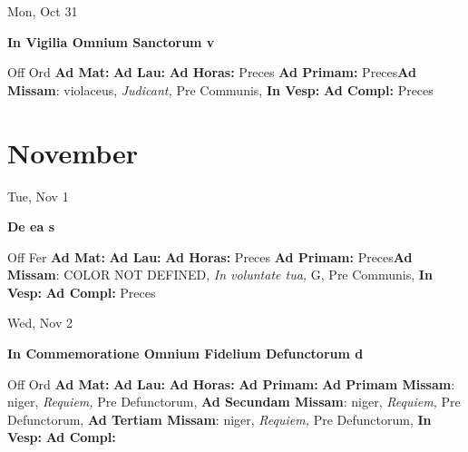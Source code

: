 \documentclass[10pt]{book}
\begin{document}
\begin{center}
\begin{minipage}{3.5in}
\vspace{2em}
\begin{center}Mon, Oct 31
\end{center}
\textbf{ \large In Vigilia Omnium Sanctorum
\textnormal{\normalsize v}}

\begin{justify}Off Ord
\textbf{Ad Mat: }
\textbf{Ad Lau: }
\textbf{Ad Horas: }Preces
\textbf{Ad Primam: }Preces\textbf{Ad Missam}: violaceus, \textit{Judicant,} Pre Communis, 
\textbf{In Vesp: }
\textbf{Ad Compl: }Preces
\end{justify}
\end{minipage}
\end{center}

    \chapter*{November}
                    
\begin{center}
\begin{minipage}{3.5in}
\vspace{2em}
\begin{center}Tue, Nov 1
\end{center}
\textbf{ \large De ea
\textnormal{\normalsize s}}

\begin{justify}Off Fer
\textbf{Ad Mat: }
\textbf{Ad Lau: }
\textbf{Ad Horas: }Preces
\textbf{Ad Primam: }Preces\textbf{Ad Missam}: COLOR NOT DEFINED, \textit{In voluntate tua,} G, Pre Communis, 
\textbf{In Vesp: }
\textbf{Ad Compl: }Preces
\end{justify}
\end{minipage}
\end{center}

\begin{center}
\begin{minipage}{3.5in}
\vspace{2em}
\begin{center}Wed, Nov 2
\end{center}
\textbf{ \large In Commemoratione Omnium Fidelium Defunctorum
\textnormal{\normalsize d}}

\begin{justify}Off Ord
\textbf{Ad Mat: }
\textbf{Ad Lau: }
\textbf{Ad Horas: }
\textbf{Ad Primam: }\textbf{Ad Primam Missam}: niger, \textit{Requiem,} Pre Defunctorum, \textbf{Ad Secundam Missam}: niger, \textit{Requiem,} Pre Defunctorum, \textbf{Ad Tertiam Missam}: niger, \textit{Requiem,} Pre Defunctorum, 
\textbf{In Vesp: }
\textbf{Ad Compl: }
\end{justify}
\end{minipage}
\end{center}
\end{document}
